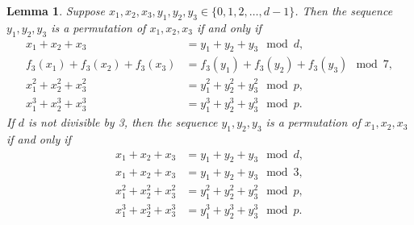 \documentclass[10pt,a4paper]{amsart}
\newtheorem{lemma}{Lemma}
\newcommand{\mmod}{\!\mod}
\begin{document}
\begin{lemma}\label{lem:DesignPermutation}
Suppose $x_1, x_2, x_3, y_1, y_2, y_3\in\{0,1,2,\ldots, d-1\}$. Then the sequence $y_1, y_2, y_3$ is a permutation of $x_1, x_2, x_3$ if and only if
\begin{equation}\label{eq:ModularCondition}
\begin{aligned}
     x_1+x_2+x_3&=y_1+y_2+y_3\mmod d,\\
f_3(x_1)+f_3(x_2)+f_3(x_3)&=f_3(y_1)+f_3(y_2)+f_3(y_3)\mmod 7,\\
x_1^2+x_2^2+x_3^2&=y_1^2+y_2^2+y_3^2\mmod p,\\
x_1^3+x_2^3+x_3^3&=y_1^3+y_2^3+y_3^3\mmod p.
\end{aligned}
\end{equation}
If $d$ is not divisible by 3, then the sequence $y_1, y_2, y_3$ is a permutation of $x_1, x_2, x_3$ if and only if
\begin{equation}\label{eq:ModularCondition2}
\begin{aligned}
     x_1+x_2+x_3&=y_1+y_2+y_3\mmod d,\\
x_1+x_2+x_3&=y_1+y_2+y_3\mmod 3,\\
x_1^2+x_2^2+x_3^2&=y_1^2+y_2^2+y_3^2\mmod p,\\
x_1^3+x_2^3+x_3^3&=y_1^3+y_2^3+y_3^3\mmod p.
\end{aligned}
\end{equation}
\end{lemma}
\end{document}

